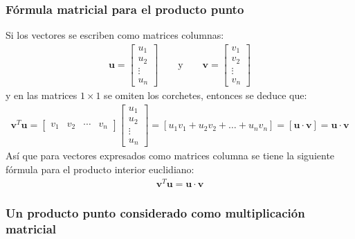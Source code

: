 \documentclass[a4paper,12pt]{article}
\begin{document}
\subsubsection{Fórmula matricial para el producto punto}

Si los vectores se escriben como matrices columnas:
\begin{align*}
  \mathbf{u}=
  \begin{bmatrix}
    u_1 \\
    u_2 \\
    \vdots \\
    u_n
  \end{bmatrix} \qquad \mbox{y} \qquad
  \mathbf{v}=
  \begin{bmatrix}
    v_1 \\
    v_2 \\
    \vdots \\
    v_n
  \end{bmatrix}
\end{align*}
y en las matrices $1\times 1$ se omiten los corchetes, entonces se deduce que:
\begin{align*}
  \mathbf{v}^T\mathbf{u}=
  \begin{bmatrix}
    v_1 & v_2 & \cdots & v_n
  \end{bmatrix}
  \begin{bmatrix}
    u_1 \\
    u_2 \\
    \vdots \\
    u_n
  \end{bmatrix}
  =[u_1v_1+u_2v_2+\ldots+u_nv_n]
  =[\mathbf{u}\cdot\mathbf{v}]=\mathbf{u}\cdot\mathbf{v}
\end{align*}
Así que para vectores expresados como matrices columna se tiene la siguiente
fórmula para el producto interior euclidiano:
\begin{align*}
  \mathbf{v}^T\mathbf{u}=\mathbf{u}\cdot\mathbf{v}
\end{align*}

\subsubsection{Un producto punto considerado como multiplicación matricial}
\end{document}

